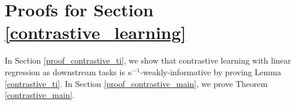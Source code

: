 \section{Proofs for Section \ref{contrastive_learning}}\label{proof_contrastive_learning}
In Section \ref{proof_contrastive_ti}, we show that contrastive learning with linear regression as downstream tasks is $\kappa^{-1}$-weakly-informative by proving Lemma \ref{contrastive_ti}. In Section \ref{proof_contrastive_main}, we prove Theorem \ref{contrastive_main}.



%


